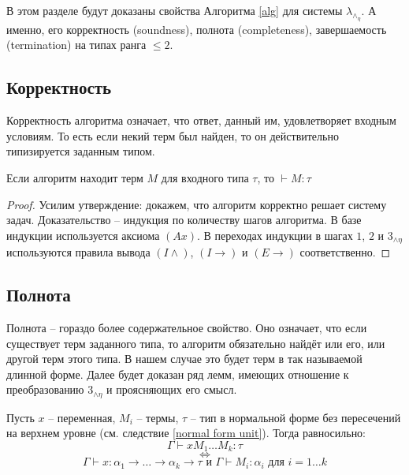 \documentclass[../main.tex]{subfiles}
\begin{document}
В этом разделе будут доказаны свойства Алгоритма \ref{alg} для системы $\lambda_\wedge_\eta$. А именно, его корректность (soundness), полнота (completeness), завершаемость (termination) на типах ранга $\leqslant 2$.


\subsection{Корректность}

Корректность алгоритма означает, что ответ, данный им, удовлетворяет входным условиям. То есть если некий терм был найден, то он действительно типизируется заданным типом.

\begin{theorem}[Soundness] \label{soundness}
Если алгоритм находит терм $M$ для входного типа $\tau$, то $\vdash M \colon \tau$
\end{theorem}
\begin{proof}
Усилим утверждение: докажем, что алгоритм корректно решает систему задач. Доказательство -- индукция по количеству шагов алгоритма. В базе индукции используется аксиома $(Ax)$. В переходах индукции в шагах $1$, $2$ и $3_{\wedge \eta}$ используются правила вывода $(I \wedge)$, $(I \to)$ и $(E \to)$ соответственно.
\end{proof}

\subsection{Полнота}

Полнота -- гораздо более содержательное свойство. Оно означает, что если существует терм заданного типа, то алгоритм обязательно найдёт или его, или другой терм этого типа. В нашем случае это будет терм в так называемой длинной форме.
Далее будет доказан ряд лемм, имеющих отношение к преобразованию $3_{\wedge \eta}$ и проясняющих его смысл. 

\begin{lemma} \label{необходимая типизация}

Пусть $x$ -- переменная, $M_i$ -- термы, $\tau$ -- тип в нормальной форме без пересечений на верхнем уровне (см. следствие \ref{normal form unit}). Тогда равносильно: 
    $$\Gamma \vdash x M_1 \dots M_k \colon \tau$$ 
    $$\iff$$
    $$\Gamma \vdash x \colon \alpha_1 \to \dots \to \alpha_k \to \tau \text{ и } \Gamma \vdash M_i \colon \alpha_i \text{ для } i = 1 \dots k$$
\end{lemma}
\end{document}
